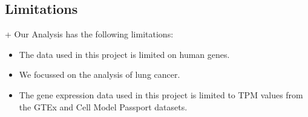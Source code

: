 \subsection{Limitations} \label{subsec:limitations}+
Our Analysis has the following limitations:
\begin{itemize}
    \item The data used in this project is limited on human genes.
    \item We focussed on the analysis of lung cancer.
    \item The gene expression data used in this project is limited to TPM values from the GTEx and Cell Model Passport datasets.
\end{itemize}



